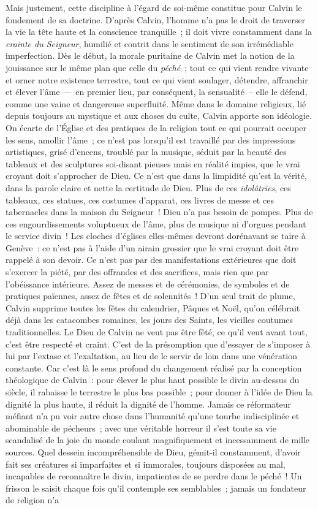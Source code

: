 \documentclass[french,twoside]{book} %
\begin{document}
Mais justement, cette discipline à l’égard de soi-même constitue pour Calvin le fondement de sa doctrine. D’après Calvin, l’homme n’a pas le droit de traverser la vie la tête haute et la conscience tranquille ; il doit vivre constamment dans la \emph{crainte du Seigneur}, humilié et contrit dans le sentiment de son irrémédiable imperfection. Dès le début, la morale puritaine de Calvin met la notion de la jouissance sur le même plan que celle du \emph{péché} ; tout ce qui vient rendre vivante et orner notre existence terrestre, tout ce qui vient soulager, détendre, affranchir et élever l’âme — en premier lieu, par conséquent, la sensualité – elle le défend, comme une vaine et dangereuse superfluité. Même dans le domaine religieux, lié depuis toujours au mystique et aux choses du culte, Calvin apporte son idéologie. On écarte de l’Église et des pratiques de la religion tout ce qui pourrait occuper les sens, amollir l’âme ; ce n’est pas lorsqu’il est travaillé par des impressions artistiques, grisé d’encens, troublé par la musique, séduit par la beauté des tableaux et des sculptures soi-disant pieuses mais en réalité impies, que le vrai croyant doit s’approcher de Dieu. Ce n’est que dans la limpidité qu’est la vérité, dans la parole claire et nette la certitude de Dieu. Plus de ces \emph{idolâtries}, ces tableaux, ces statues, ces costumes d’apparat, ces livres de messe et ces tabernacles dans la maison du Seigneur ! Dieu n’a pas besoin de pompes. Plus de ces engourdissements voluptueux de l’âme, plus de musique ni d’orgues pendant le service divin ! Les cloches d’églises elles-mêmes devront dorénavant se taire à Genève : ce n’est pas à l’aide d’un airain grossier que le vrai croyant doit être rappelé à son devoir. Ce n’est pas par des manifestations extérieures que doit s’exercer la piété, par des offrandes et des sacrifices, mais rien que par l’obéissance intérieure. Assez de messes et de cérémonies, de symboles et de pratiques païennes, assez de fêtes et de solennités ! D’un seul trait de plume, Calvin supprime toutes les fêtes du calendrier, Pâques et Noël, qu’on célébrait déjà dans les catacombes romaines, les jours des Saints, les vieilles coutumes traditionnelles. Le Dieu de Calvin ne veut pas être fêté, ce qu’il veut avant tout, c’est être respecté et craint. C’est de la présomption que d’essayer de s’imposer à lui par l’extase et l’exaltation, au lieu de le servir de loin dans une vénération constante. Car c’est là le sens profond du changement réalisé par la conception théologique de Calvin : pour élever le plus haut possible le divin au-dessus du siècle, il rabaisse le terrestre le plus bas possible ; pour donner à l’idée de Dieu la dignité la plus haute, il réduit la dignité de l’homme. Jamais ce réformateur méfiant n’a pu voir autre chose dans l’humanité qu’une tourbe indisciplinée et abominable de pécheurs ; avec une véritable horreur il s’est toute sa vie scandalisé de la joie du monde coulant magnifiquement et incessamment de mille sources. Quel dessein incompréhensible de Dieu, gémit-il constamment, d’avoir fait ses créatures si imparfaites et si immorales, toujours disposées au mal, incapables de reconnaître le divin, impatientes de se perdre dans le péché ! Un frisson le saisit chaque fois qu’il contemple ses semblables ; jamais un fondateur de religion n’a 
\end{document}
